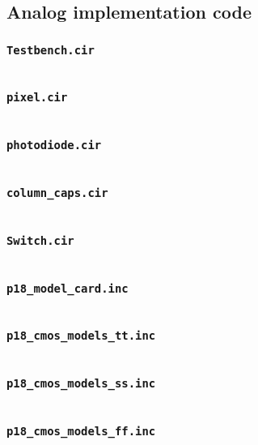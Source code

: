 \subsection{Analog implementation code}\label{app:analog}

\subsubsection{\texttt{Testbench.cir}}
\inputminted{text}{Code/Spice/Testbench.cir}

\clearpage
\subsubsection{\texttt{pixel.cir}}
\inputminted{text}{Code/Spice/pixel.cir}

\clearpage
\subsubsection{\texttt{photodiode.cir}}
\inputminted{text}{Code/Spice/photodiode.cir}

\subsubsection{\texttt{column\_caps.cir}}
\inputminted{text}{Code/Spice/column_caps.cir}

\subsubsection{\texttt{Switch.cir}}
\label{app:switch}
\inputminted{text}{Code/Spice/Switch.cir}

\subsubsection{\texttt{p18\_model\_card.inc}}
\inputminted{text}{Code/Spice/p18_model_card.inc}

\clearpage
\subsubsection{\texttt{p18\_cmos\_models\_tt.inc}}
\inputminted{text}{Code/Spice/p18_cmos_models_tt.inc}

\subsubsection{\texttt{p18\_cmos\_models\_ss.inc}}
\inputminted{text}{Code/Spice/p18_cmos_models_ss.inc}

\subsubsection{\texttt{p18\_cmos\_models\_ff.inc}}
\inputminted{text}{Code/Spice/p18_cmos_models_ff.inc}